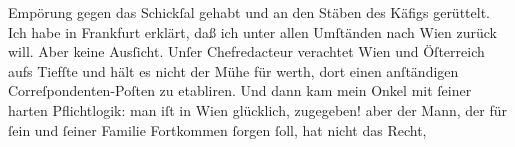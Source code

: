                Empörung gegen das Schickſal gehabt und an den Stäben des Käfigs gerüttelt. Ich habe
               in Frankfurt erklärt, daß ich unter allen
               Umſtänden nach Wien zurück will. Aber keine
               Ausſicht. Unſer Chefredacteur verachtet Wien und Öſterreich aufs Tiefſte und hält es nicht der
               Mühe für werth, dort einen anſtändigen Correſpondenten-Poſten zu etabliren. Und dann
               kam mein Onkel mit ſeiner harten Pflichtlogik:
               man iſt in Wien glücklich, zugegeben! aber der
               Mann, der für ſein und ſeiner Familie Fortkommen ſorgen ſoll, hat nicht das Recht,
